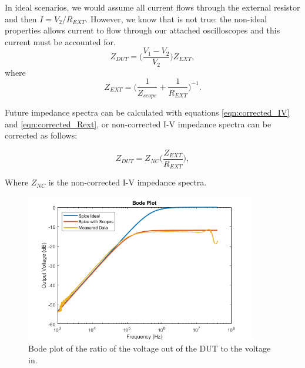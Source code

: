 \par In ideal scenarios, we would assume all current flows through the external resistor and then $I = V_2 / R_{EXT}$. However, we know that is not true: the non-ideal properties allows current to flow through our attached oscilloscopes and this current must be accounted for. 
\begin{equation}
    Z_{DUT} = \bigg(\frac{V_1 - V_2}{V_2}\bigg)Z_{EXT},
    \label{eqn:corrected_IV}
\end{equation}
\noindent where
\begin{equation}
    Z_{EXT} = \bigg(\frac{1}{Z_{scope}}+\frac{1}{R_{EXT}}\bigg)^{-1}.
    \label{eqn:corrected_Rext}
\end{equation}

\par Future impedance spectra can be calculated with equations \ref{eqn:corrected_IV} and \ref{eqn:corrected_Rext}, or non-corrected I-V impedance spectra can be corrected as follows:

\begin{equation}
    Z_{DUT} = Z_{NC}\bigg(\frac{Z_{EXT}}{R_{EXT}}\bigg),
\end{equation}

\noindent Where $Z_{NC}$ is the non-corrected I-V impedance spectra.



\begin{figure}[h]
    \centering
    \includegraphics[width=0.9\textwidth]{images/spice-measured-comp.png}
    \caption{Bode plot of the ratio of the voltage out of the DUT to the voltage in.}
    \label{fig:test_circuit_bode}
\end{figure}



